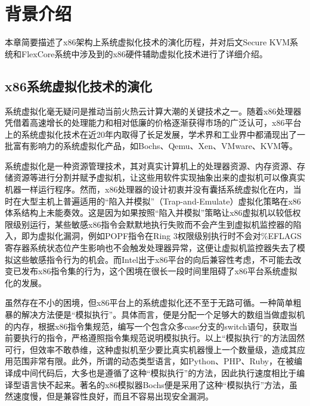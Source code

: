 
\chapter{背景介绍}
\label{chap:background}

本章简要描述了x86架构上系统虚拟化技术的演化历程，并对后文Secure KVM系统和FlexCore系统中涉及到的x86硬件辅助虚拟化技术进行了详细介绍。

\section{x86系统虚拟化技术的演化}

系统虚拟化毫无疑问是推动当前火热云计算大潮的关键技术之一。随着x86处理器凭借着高速增长的处理能力和相对低廉的价格逐渐获得市场的广泛认可，x86平台上的系统虚拟化技术在近20年内取得了长足发展，学术界和工业界中都涌现出了一批富有影响力的系统虚拟化产品，如Bochs、Qemu、Xen、VMware、KVM等。

系统虚拟化是一种资源管理技术，其对真实计算机上的处理器资源、内存资源、存储资源等进行分割并赋予虚拟机，让这些用软件实现抽象出来的虚拟机可以像真实机器一样运行程序。然而，x86处理器的设计初衷并没有囊括系统虚拟化在内，当时在大型主机上普遍适用的``陷入并模拟''（Trap-and-Emulate）虚拟化策略在x86体系结构上未能奏效。这是因为如果按照``陷入并模拟''策略让x86虚拟机以较低权限级别运行，某些敏感x86指令会默默地执行失败而不会产生到虚拟机监控器的陷入，即为虚拟化漏洞，例如POPF指令在Ring 3权限级别执行时不会对\%EFLAGS寄存器系统状态位产生影响也不会触发处理器异常，这便让虚拟机监控器失去了模拟这些敏感指令行为的机会。而Intel出于x86平台的向后兼容性考虑，不可能去改变已发布x86指令集的行为，这个困境在很长一段时间里阻碍了x86平台系统虚拟化的发展。

虽然存在不小的困境，但x86平台上的系统虚拟化还不至于无路可循。一种简单粗暴的解决方法便是``模拟执行''。具体而言，便是分配一个足够大的数组当做虚拟机的内存，根据x86指令集规范，编写一个包含众多case分支的switch语句，获取当前要执行的指令，严格遵照指令集规范说明模拟执行。以上``模拟执行''的方法固然可行，但效率不敢恭维，这种虚拟机至少要比真实机器慢上一个数量级，造成其应用范围非常有限。此外，所谓的动态类型语言，如Python、PHP、Ruby，在被编译成中间代码后，大多也是遵循了这种``模拟执行''的方法，因此执行速度相比于编译型语言快不起来。著名的x86模拟器Bochs便是采用了这种``模拟执行''方法，虽然速度慢，但是兼容性良好，而且不容易出现安全漏洞。

